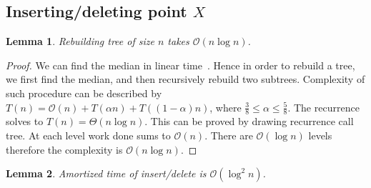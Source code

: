 \documentclass[10pt,a4paper]{article}
\newtheorem{lemma}{Lemma}
\newcommand{\Oh}{\mathcal{O}}
\begin{document}
\subsection{Inserting/deleting point $X$}

\begin{lemma}\label{lem:1}
Rebuilding tree of size $n$ takes $\Oh(n \log n)$.
\end{lemma}

\begin{proof}
We can find the median in linear time~\cite{FIVE}. Hence in order to rebuild a tree, we first find the median, and then recursively rebuild two subtrees. Complexity of such procedure can be described by $T(n)=\Oh(n)+T(\alpha n)+T((1-\alpha)n)$, where $\frac{3}{8}\leq \alpha \leq \frac{5}{8}$. The recurrence solves to $T(n)=\Theta(n\log n)$. This can be proved by drawing recurrence call tree. At each level work done sums to $\Oh(n)$. There are $\Oh(\log n)$ levels therefore the complexity is $\Oh(n \log n)$.
\end{proof}

\begin{lemma}\label{lem:2}
Amortized time of insert/delete is $\Oh(\log^2 n)$.
\end{lemma}
\end{document}
